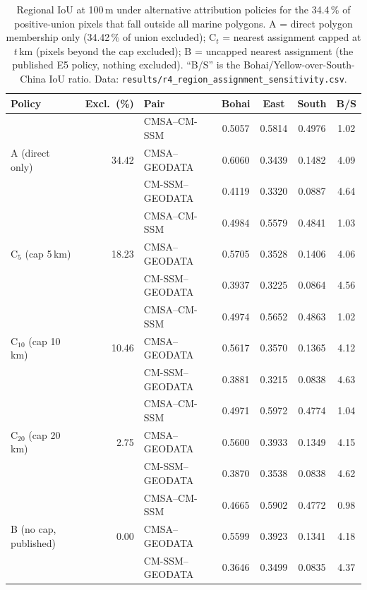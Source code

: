 \begin{table}[htpb]
\centering
\caption{\label{tab:region_policy}Regional IoU at 100\,m under alternative
  attribution policies for the 34.4\,\% of positive-union pixels that fall
  outside all marine polygons. A = direct polygon membership only
  (34.42\,\% of union excluded); C$_t$ = nearest assignment capped at
  $t$\,km (pixels beyond the cap excluded); B = uncapped nearest assignment
  (the published E5 policy, nothing excluded). ``B/S'' is the
  Bohai/Yellow-over-South-China IoU ratio. Data:
  \texttt{results/r4\_region\_assignment\_sensitivity.csv}.}
\begin{tabular}{l r l c c c c}
\toprule
Policy & Excl.\ (\%) & Pair & Bohai & East & South & B/S \\
\midrule
\multirow{3}{*}{A (direct only)}
  & \multirow{3}{*}{34.42}
  & CMSA--CM-SSM & 0.5057 & 0.5814 & 0.4976 & 1.02 \\
  & & CMSA--GEODATA & 0.6060 & 0.3439 & 0.1482 & 4.09 \\
  & & CM-SSM--GEODATA & 0.4119 & 0.3320 & 0.0887 & 4.64 \\
\midrule
\multirow{3}{*}{C$_5$ (cap 5\,km)}
  & \multirow{3}{*}{18.23}
  & CMSA--CM-SSM & 0.4984 & 0.5579 & 0.4841 & 1.03 \\
  & & CMSA--GEODATA & 0.5705 & 0.3528 & 0.1406 & 4.06 \\
  & & CM-SSM--GEODATA & 0.3937 & 0.3225 & 0.0864 & 4.56 \\
\midrule
\multirow{3}{*}{C$_{10}$ (cap 10\,km)}
  & \multirow{3}{*}{10.46}
  & CMSA--CM-SSM & 0.4974 & 0.5652 & 0.4863 & 1.02 \\
  & & CMSA--GEODATA & 0.5617 & 0.3570 & 0.1365 & 4.12 \\
  & & CM-SSM--GEODATA & 0.3881 & 0.3215 & 0.0838 & 4.63 \\
\midrule
\multirow{3}{*}{C$_{20}$ (cap 20\,km)}
  & \multirow{3}{*}{2.75}
  & CMSA--CM-SSM & 0.4971 & 0.5972 & 0.4774 & 1.04 \\
  & & CMSA--GEODATA & 0.5600 & 0.3933 & 0.1349 & 4.15 \\
  & & CM-SSM--GEODATA & 0.3870 & 0.3538 & 0.0838 & 4.62 \\
\midrule
\multirow{3}{*}{B (no cap, published)}
  & \multirow{3}{*}{0.00}
  & CMSA--CM-SSM & 0.4665 & 0.5902 & 0.4772 & 0.98 \\
  & & CMSA--GEODATA & 0.5599 & 0.3923 & 0.1341 & 4.18 \\
  & & CM-SSM--GEODATA & 0.3646 & 0.3499 & 0.0835 & 4.37 \\
\bottomrule
\end{tabular}
\end{table}
